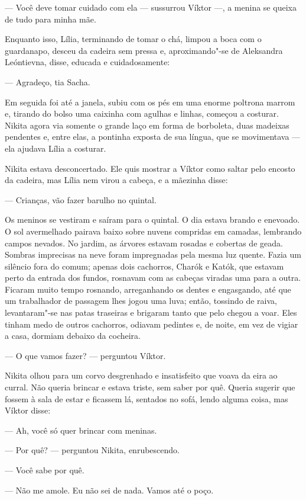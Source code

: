 --- Você deve tomar cuidado com ela --- sussurrou Víktor ---, a menina
se queixa de tudo para minha mãe.

Enquanto isso, Lília, terminando de tomar o chá, limpou a boca com o
guardanapo, desceu da cadeira sem pressa e, aproximando"-se de Aleksandra
Leóntievna, disse, educada e cuidadosamente:

--- Agradeço, tia Sacha.

Em seguida foi até a janela, subiu com os pés em uma enorme poltrona
marrom e, tirando do bolso uma caixinha com agulhas e linhas, começou a
costurar. Nikita agora via somente o grande laço em forma de borboleta,
duas madeixas pendentes e, entre elas, a pontinha exposta de sua
língua, que se movimentava --- ela ajudava Lília a costurar.

Nikita estava desconcertado. Ele quis mostrar a Víktor como saltar pelo
encosto da cadeira, mas Lília nem virou a cabeça, e a mãezinha disse:

--- Crianças, vão fazer barulho no quintal.

Os meninos se vestiram e saíram para o quintal. O dia estava brando e
enevoado. O sol avermelhado pairava baixo sobre nuvens compridas em
camadas, lembrando campos nevados. No jardim, as árvores estavam rosadas
e cobertas de geada. Sombras imprecisas na neve foram impregnadas pela
mesma luz quente. Fazia um silêncio fora do comum; apenas dois
cachorros, Charók e Katók, que estavam perto da entrada dos fundos,
rosnavam com as cabeças viradas uma para a outra. Ficaram muito tempo
rosnando, arreganhando os dentes e engasgando, até que um trabalhador de
passagem lhes jogou uma luva; então, tossindo de raiva, levantaram"-se
nas patas traseiras e brigaram tanto que pelo chegou a voar. Eles tinham
medo de outros cachorros, odiavam pedintes e, de noite, em vez de vigiar
a casa, dormiam debaixo da cocheira.

--- O que vamos fazer? --- perguntou Víktor.

Nikita olhou para um corvo desgrenhado e insatisfeito que voava da eira
ao curral. Não queria brincar e estava triste, sem saber por quê. Queria
sugerir que fossem à sala de estar e ficassem lá, sentados no sofá,
lendo alguma coisa, mas Víktor disse:

--- Ah, você só quer brincar com meninas.

--- Por quê? --- perguntou Nikita, enrubescendo.

--- Você sabe por quê.

--- Não me amole. Eu não sei de nada. Vamos até o poço.

